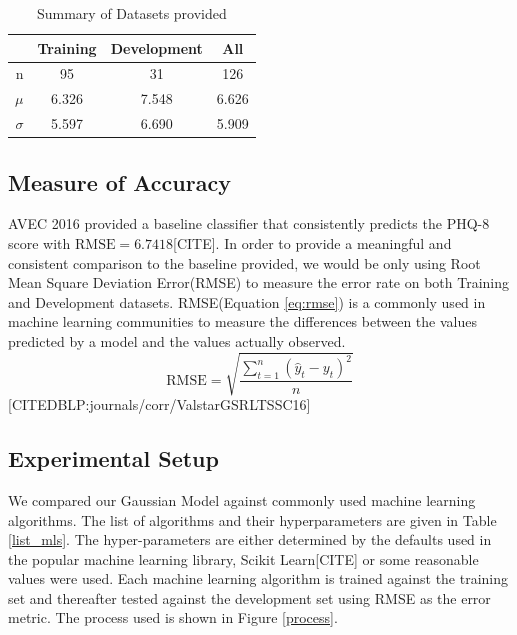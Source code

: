 \documentclass{article}
\begin{document}
 	\begin{table}[h]
 		\begin{center}
  			\begin{tabular}{ | r | c | c || c | }
    			\hline
			 & Training & Development & All \\ \hline
			 n               & 95 & 31 & 126 \\ \hline
			 $\mu$           & 6.326 & 7.548 & 6.626 \\ \hline
			 $\sigma$        & 5.597 & 6.690 & 5.909 \\ \hline
			 \end{tabular}
		\end{center}
 	\caption{Summary of Datasets provided}
 	\label{summary_table}
 	\end{table}

 	\subsection{Measure of Accuracy}
	AVEC 2016 provided a baseline classifier that consistently predicts the PHQ-8 score with $\text{RMSE}=6.7418$[CITE]. In order to provide a meaningful and consistent comparison to the baseline provided, we would be only using Root Mean Square Deviation Error(RMSE) to measure the error rate on both Training and Development datasets. RMSE(Equation \ref{eq:rmse}) is a commonly used in machine learning communities to measure the differences between the values predicted by a model and the values actually observed. 
	\begin{equation}\label{eq:rmse}
  	\text{RMSE} = \sqrt{\frac{\sum_{t=1}^n (\hat y_t - y_t)^2}{n}}
 	\end{equation}
	[CITEDBLP:journals/corr/ValstarGSRLTSSC16]

	\subsection{Experimental Setup}
	We compared our Gaussian Model against commonly used machine learning algorithms. The list of algorithms and their hyperparameters are given in Table \ref{list_mls}. The hyper-parameters are either determined by the defaults used in the popular machine learning library, Scikit Learn[CITE] or some reasonable values were used. Each machine learning algorithm is trained against the training set and thereafter tested against the development set using RMSE as the error metric. The process used is shown in Figure \ref{process}.
\end{document}
